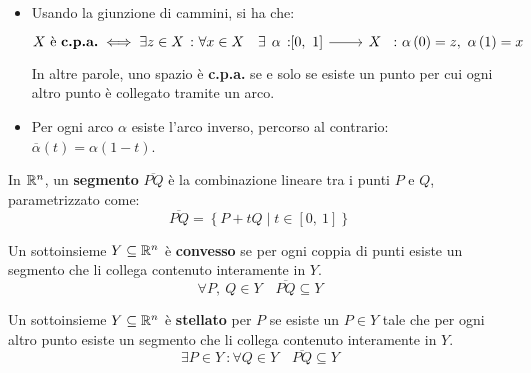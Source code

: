 \begin{observes}~{}\label{giunzionecpa}
	\begin{itemize}
		\item Usando la giunzione di cammini, si ha che:
		\begin{equation*}
			X\text{ è \textbf{c.p.a.}}\iff \exists z\in X\ \colon \forall x\in X\quad
			\exists \funz{\alpha}{\left[0,\ 1\right]}{X}\ \colon \alpha\left(0\right)=z,\ \alpha\left(1\right)=x
		\end{equation*}
		In altre parole, uno spazio è \textbf{c.p.a.} se e solo se esiste un punto per cui ogni altro punto è collegato tramite un arco.
		\item Per ogni arco $\alpha$ esiste l'arco inverso, percorso al contrario: $\overline{\alpha}\left(t\right)=\alpha\left(1-t\right)$.
	\end{itemize}
\vspace{-3mm}
\end{observes}
\begin{define}[Segmento.]\label{segmento}
	In $\mathbb{R}^n$, un \textbf{segmento} $\overline{PQ}$ è la combinazione lineare tra i punti $P$ e $Q$, parametrizzato come:
	\begin{equation}
		\overline{PQ}=\left\{P+tQ\mid t\in\left[0,\ 1\right]\right\}
	\end{equation}
\vspace{-6mm}
\end{define}
\begin{define}
	Un sottoinsieme $Y\subseteq\mathbb{R}^n$ è \textbf{convesso} se per ogni coppia di punti esiste un segmento che li collega contenuto interamente in $Y$.
	\begin{equation}
		\forall P,\ Q\in Y\quad \overline{PQ}\subseteq Y
	\end{equation}
\vspace{-6mm}
\end{define}
\begin{define}
	Un sottoinsieme $Y\subseteq\mathbb{R}^n$ è \textbf{stellato} per $P$ se esiste un $P\in Y$ tale che per ogni altro punto esiste un segmento che li collega contenuto interamente in $Y$.
	\begin{equation}
		\exists P \in Y\ \colon \forall Q\in Y\quad \overline{PQ}\subseteq Y
	\end{equation}
\vspace{-6mm}
\end{define}
